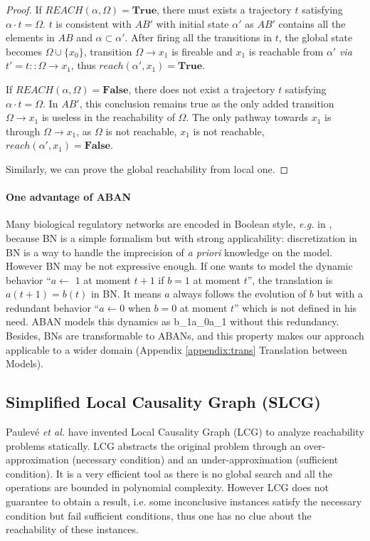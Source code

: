 \begin{proof}
If $REACH(\alpha,\Omega)=\mathbf{True}$, there must exists a trajectory $t$ satisfying $\alpha\cdot t=\Omega$.
$t$ is consistent with $AB'$ with initial state $\alpha'$ as $AB'$ contains all the elements in $AB$ and $\alpha\subset\alpha'$.
After firing all the transitions in $t$, the global state becomes $\Omega\cup\{x_0\}$, transition $\Omega\to x_1$ is fireable and $x_1$ is reachable from $\alpha'$ \textit{via} $t'=t::\Omega\to x_1$, thus $reach(\alpha', x_1)=\mathbf{True}$. 

If $REACH(\alpha,\Omega)=\mathbf{False}$, there does not exist a trajectory $t$ satisfying $\alpha\cdot t=\Omega$.
In $AB'$, this conclusion remains true as the only added transition $\Omega\to x_1$ is useless in the reachability of $\Omega$.
The only pathway towards $x_1$ is through $\Omega\to x_1$, as $\Omega$ is not reachable, $x_1$ is not reachable, $reach(\alpha', x_1)=\mathbf{False}$.

Similarly, we can prove the global reachability from local one.
\end{proof}

\paragraph{\textbf{One advantage of ABAN}}\label{par:advantage}
Many biological regulatory networks are encoded in Boolean style, \textit{e.g.} in \cite{akutsu2007control,kauffman1969}, because BN is a simple formalism but with strong applicability: discretization in BN is a way to handle the imprecision of \textit{a priori} knowledge on the model.
However BN may be not expressive enough.
If one wants to model the dynamic behavior ``$a\gets$ $1$ at moment $t+1$ if $b=1$ at moment $t$'', the translation is $a(t+1)=b(t)$ in BN.
It means $a$ always follows the evolution of $b$ but with a redundant behavior ``$a\gets 0$ when $b=0$ at moment $t$'' which is not defined in his need.
ABAN models this dynamics as \ac{b_1}{a_0}{a_1} without this redundancy. 
Besides, BNs are transformable to ABANs, and this property makes our approach applicable to a wider domain (Appendix \ref{appendix:trans} Translation between Models).

\subsection{Simplified Local Causality Graph (SLCG)}\label{sec:SLCG}
Paulev\'e \textit{et al.} \cite{pauleve2011} have invented Local Causality Graph (LCG) to analyze reachability problems statically.
LCG abstracts the original problem through an over-approximation (necessary condition) and an under-approximation (sufficient condition).
It is a very efficient tool as there is no global search and all the operations are bounded in polynomial complexity.
However LCG does not guarantee to obtain a result, i.e. some inconclusive instances satisfy the necessary condition but fail sufficient conditions, thus one has no clue about the reachability of these instances.

